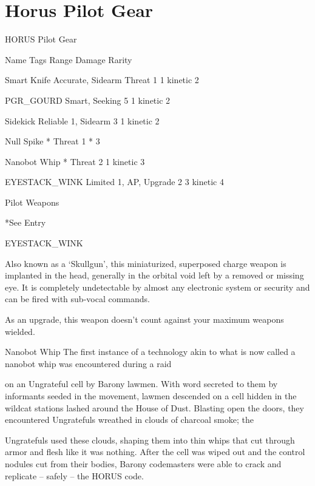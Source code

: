 \section{Horus Pilot Gear}

                                          HORUS Pilot Gear

 Name                   Tags                                   Range           Damage                Rarity

 Smart Knife            Accurate, Sidearm                     Threat 1         1 kinetic              2

 PGR\_GOURD              Smart, Seeking                         5               1 kinetic              2

 Sidekick               Reliable 1, Sidearm                    3               1 kinetic              2

 Null Spike             *                                     Threat 1        *                       3

 Nanobot Whip           *                                     Threat 2         1 kinetic              3

 EYESTACK\_WINK          Limited 1, AP, Upgrade                 2              3 kinetic               4

                                                Pilot Weapons

*See Entry


EYESTACK\_WINK

Also known as a ‘Skullgun’, this miniaturized, superposed charge weapon is implanted in the head,
generally in the orbital void left by a removed or missing eye. It is completely undetectable by almost any
electronic system or security and can be fired with sub-vocal commands.

As an upgrade, this weapon doesn’t count against your maximum weapons wielded.


Nanobot Whip
The first instance of a technology akin to what is now called a nanobot whip was encountered during a raid

on an Ungrateful cell by Barony lawmen. With word secreted to them by informants seeded in the
movement, lawmen descended on a cell hidden in the wildcat stations lashed around the House of Dust.
Blasting open the doors, they encountered Ungratefuls wreathed in clouds of charcoal smoke; the

Ungratefuls used these clouds, shaping them into thin whips that cut through armor and flesh like it was
nothing. After the cell was wiped out and the control nodules cut from their bodies, Barony codemasters
were able to crack and replicate -- safely -- the HORUS code.

